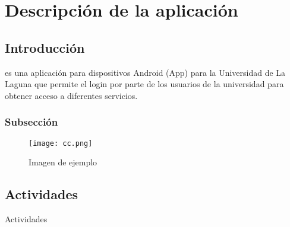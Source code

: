 %
%
%
%

\cleardoublepage

\chapter{Descripción de la aplicación}

\section{Introducción}

\App{} es una aplicación para dispositivos Android (App) para la Universidad de La Laguna que permite el login por parte de los usuarios 
de la universidad para obtener acceso a diferentes servicios.

\subsection{Subsección}

\begin{figure}[h]
	\centering
	\texttt{[image: cc.png]}
	\caption{Imagen de ejemplo}
	\label{fig:ejemplo}
\end{figure}

\section{Actividades}

Actividades
